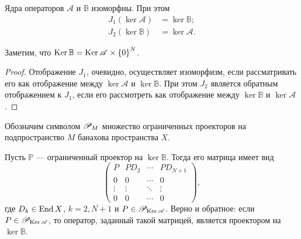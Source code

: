 \begin{lemma}\label{le:keris}
    Ядра операторов $\mathcal A$ и $\mathbb B$ изоморфны. При этом
    \begin{align*}
         J_1(\ker \mathcal A) &= \ker \mathbb B; \\
         J_2(\ker \mathbb B) &= \ker \mathcal A.
    \end{align*}
\end{lemma}

Заметим, что $\operatorname{Ker} \mathbb B = \operatorname{Ker} \mathcal A \times \left\{0\right\}^{N}$.

\begin{proof}
    Отображение $J_1$, очевидно, осуществляет изоморфизм, если рассматривать его как отображение между $\ker \mathcal A$ и $\ker \mathbb B$. При этом $ J_2$ является обратным отображением к $ J_1$, если его рассмотреть как отображение между $\ker \mathbb B$ и $\ker \mathcal A$.
\end{proof}

Обозначим символом $\mathcal P_{M}$ множество ограниченных проекторов на подпространство $M$ банахова пространства $X$.

\begin{lemma}\label{le:kerproj}
    Пусть $\mathbb P$ --- ограниченный проектор на $\ker \mathbb B$. Тогда его матрица имеет вид
    \[ \begin{pmatrix}
    P & PD_2 & \cdots & PD_{N+1} \\
    0 & 0 & \cdots  & 0 \\
    \vdots & \vdots & \ddots & \vdots \\
    0 & 0 & \cdots & 0
   \end{pmatrix}, \]
   где $D_k \in \operatorname{End} X$, $k = \overline{2,N+1}$ и $P \in \mathcal P_{\operatorname{Ker} \mathcal A}$. Верно и обратное: если $P \in \mathcal P_{\operatorname{Ker} \mathcal A}$, то оператор, заданный такой матрицей, является
   проектором на $\ker \mathbb B$.
\end{lemma}

